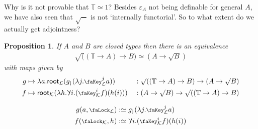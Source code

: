 \documentclass[10pt]{article} \usepackage{fullpage}
\newtheorem{proposition}[theorem]{Proposition}
\theoremstyle{definition}
\let\oldequiv\equiv%
\renewcommand{\equiv}{\simeq}
\newcommand{\defeq}{\oldequiv}
\newcommand{\lock}{\mathchoice {\scalebox{0.8}{\text{\faLock}}}
  {\scalebox{0.8}{\text{\faLock}}} {\scalebox{0.5}{\text{\faLock}}}
  {\scalebox{0.4}{\text{\faLock}}} }
\newcommand{\key}{\mathchoice
  {\scalebox{0.8}{\text{\faKey}}} {\scalebox{0.8}{\text{\faKey}}}
  {\scalebox{0.5}{\text{\faKey}}} {\scalebox{0.4}{\text{\faKey}}} }
\newcommand{\Tiny}{\mathbb{T}}
\newcommand{\lockn}[1]{\mathcal{#1}}
\newcommand{\varkeye}[2]{\key_{#1}^{#2}}
\newcommand{\varkey}[2]{\varkeye{\lockn{#1}}{#2}}
\newcommand{\ctxlocke}[1]{\lock_{#1}}
\newcommand{\ctxlock}[1]{\ctxlocke{\lockn{#1}}}
\newcommand{\rformu}[1]{\surd #1}
\newcommand{\rintro}[2]{\mathsf{root}_{\lockn{#1}}(#2)}
\newcommand{\rbindsym}{\raisebox{-0.5pt}{\scalerel*{\reflectbox{\rotatebox[origin=c]{180}{$\lambda$}}}{\lambda}}}
\newcommand{\relim}[1]{\rbindsym #1}
\newcommand{\rget}[1]{{#1}_{\downharpoonleft}}
\begin{document}
Why is it not provable that $\Tiny \equiv 1$? Besides $\varepsilon_A$
not being definable for general $A$, we have also seen that
$\rformu -$ is not `internally functorial'. So to what extent do we
actually get adjointness?
\begin{proposition}
  If $A$ and $B$ are closed types then there is an equivalence
  \begin{align*}
    \rformu ((\Tiny \to A) \to B) \equiv (A \to \rformu B)
  \end{align*}
  with maps given by
  \begin{alignat*}{2}
    g &\mapsto \lambda a. \rintro{L}{\rget{g}(\lambda j.\varkey{L}{j} a)} &&: \rformu((\Tiny \to A) \to B) \to (A \to \rformu B) \\
    f &\mapsto \rintro{K}{\lambda h. \relim{i.(\varkey{K}{i} f)(h(i))}} &&: (A \to \rformu B) \to \rformu ((\Tiny \to A) \to B)
  \end{alignat*}

  \begin{alignat*}{2}
    g(a, \ctxlock{L}) &:\defeq \rget{g}(\lambda j.\varkey{L}{j} a) \\
    f(\ctxlock{K}, h) &:\defeq \relim{i.(\varkey{K}{i} f)(h(i))}
  \end{alignat*}
\end{proposition}
\end{document}
